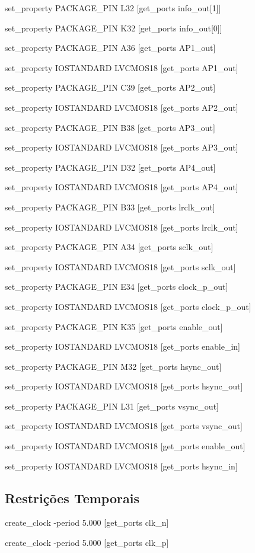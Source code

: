 set\_property PACKAGE\_PIN L32 [get\_ports {info\_out[1]}]

set\_property PACKAGE\_PIN K32 [get\_ports {info\_out[0]}]



set\_property PACKAGE\_PIN A36 [get\_ports AP1\_out]

set\_property IOSTANDARD LVCMOS18 [get\_ports AP1\_out]

set\_property PACKAGE\_PIN C39 [get\_ports AP2\_out]

set\_property IOSTANDARD LVCMOS18 [get\_ports AP2\_out]

set\_property PACKAGE\_PIN B38 [get\_ports AP3\_out]

set\_property IOSTANDARD LVCMOS18 [get\_ports AP3\_out]

set\_property PACKAGE\_PIN D32 [get\_ports AP4\_out]

set\_property IOSTANDARD LVCMOS18 [get\_ports AP4\_out]

set\_property PACKAGE\_PIN B33 [get\_ports lrclk\_out]

set\_property IOSTANDARD LVCMOS18 [get\_ports lrclk\_out]


set\_property PACKAGE\_PIN A34 [get\_ports sclk\_out]

set\_property IOSTANDARD LVCMOS18 [get\_ports sclk\_out]


set\_property PACKAGE\_PIN E34 [get\_ports clock\_p\_out]

set\_property IOSTANDARD LVCMOS18 [get\_ports clock\_p\_out]

set\_property PACKAGE\_PIN K35 [get\_ports enable\_out]

set\_property IOSTANDARD LVCMOS18 [get\_ports enable\_in]

set\_property PACKAGE\_PIN M32 [get\_ports hsync\_out]

set\_property IOSTANDARD LVCMOS18 [get\_ports hsync\_out]

set\_property PACKAGE\_PIN L31 [get\_ports vsync\_out]

set\_property IOSTANDARD LVCMOS18 [get\_ports vsync\_out]

set\_property IOSTANDARD LVCMOS18 [get\_ports enable\_out]

set\_property IOSTANDARD LVCMOS18 [get\_ports hsync\_in]

\subsection{Restrições Temporais}\label{ap2:planC_timing_cnstrs}

create\_clock -period 5.000 [get\_ports clk\_n]

create\_clock -period 5.000 [get\_ports clk\_p]